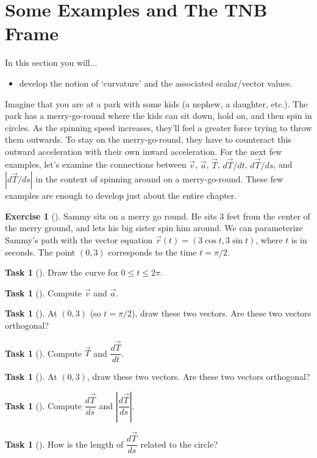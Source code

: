 \documentclass[10pt,]{book}
\theoremstyle{plain}
\theoremstyle{definition}
\theoremstyle{definition}
\theoremstyle{definition}
\theoremstyle{definition}
\newtheorem{exploration}[project]{Exercise}
\newtheorem{task}[project]{Task}
\theoremstyle{definition}
\numberwithin{equation}{section}
\begin{document}
\section[{Some Examples and The TNB Frame}]{Some Examples and The TNB Frame}\label{section-26}
In this section you will... \leavevmode%
\begin{itemize}[label=\textbullet]
\item{}develop the notion of `curvature' and the associated scalar/vector values.%
\end{itemize}
%
\par
Imagine that you are at a park with some kids (a nephew, a daughter, etc.). The park has a merry-go-round where the kids can sit down, hold on, and then spin in circles. As the spinning speed increases, they'll feel a greater force trying to throw them outwards. To stay on the merry-go-round, they have to counteract this outward acceleration with their own inward acceleration. For the next few examples, let's examine the connections between \(\vec v\), \(\vec a\), \(\vec T\), \(d\vec T/dt\), \(d\vec T/ds\), and \(|d\vec T/ds|\) in the context of spinning around on a merry-go-round. These few examples are enough to develop just about the entire chapter.%
\begin{exploration}[]\label{exploration-170}
Sammy sits on a merry go round. He sits 3 feet from the center of the merry ground, and lets his big sister spin him around. We can parameterize Sammy's path with the vector equation \(\vec r(t) = (3\cos t, 3\sin t)\), where \(t\) is in seconds. The point \((0,3)\) corresponds to the time \(t=\pi/2\).%
\begin{task}[]\label{task-401}
Draw the curve for \(0\leq t\leq 2\pi\).%
\end{task}
\begin{task}[]\label{task-402}
Compute \(\vec v\) and \(\vec a\).%
\end{task}
\begin{task}[]\label{task-403}
At \((0,3)\) (so \(t=\pi/2\)), draw these two vectors. Are these two vectors orthogonal?%
\end{task}
\begin{task}[]\label{task-404}
Compute \(\vec T\) and \(\dfrac{d\vec T}{dt}\).%
\end{task}
\begin{task}[]\label{task-405}
At \((0,3)\), draw these two vectors. Are these two vectors orthogonal?%
\end{task}
\begin{task}[]\label{task-406}
Compute \(\dfrac{d\vec T}{ds}\) and \(\left|\dfrac{d\vec T}{ds}\right|\).%
\end{task}
\begin{task}[]\label{task-407}
How is the length of \(\dfrac{d\vec T}{ds}\) related to the circle?%
\end{task}
\end{exploration}
\end{document}
